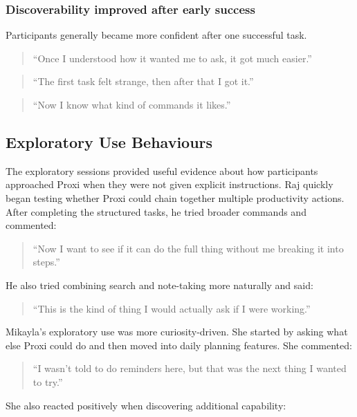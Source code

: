 \documentclass[12pt, titlepage]{article}
\begin{document}
\subsubsection{Discoverability improved after early success}

Participants generally became more confident after one successful task.

\begin{quote}
``Once I understood how it wanted me to ask, it got much easier.''
\end{quote}

\begin{quote}
``The first task felt strange, then after that I got it.''
\end{quote}

\begin{quote}
``Now I know what kind of commands it likes.''
\end{quote}

\subsection{Exploratory Use Behaviours}

The exploratory sessions provided useful evidence about how participants
approached Proxi when they were not given explicit instructions. Raj
quickly began testing whether Proxi could chain together multiple
productivity actions. After completing the structured tasks, he tried
broader commands and commented:

\begin{quote}
``Now I want to see if it can do the full thing without me breaking it
into steps.''
\end{quote}

He also tried combining search and note-taking more naturally and said:

\begin{quote}
``This is the kind of thing I would actually ask if I were working.''
\end{quote}

Mikayla's exploratory use was more curiosity-driven. She started by
asking what else Proxi could do and then moved into daily planning
features. She commented:

\begin{quote}
``I wasn't told to do reminders here, but that was the next thing I
wanted to try.''
\end{quote}

She also reacted positively when discovering additional capability:
\end{document}
